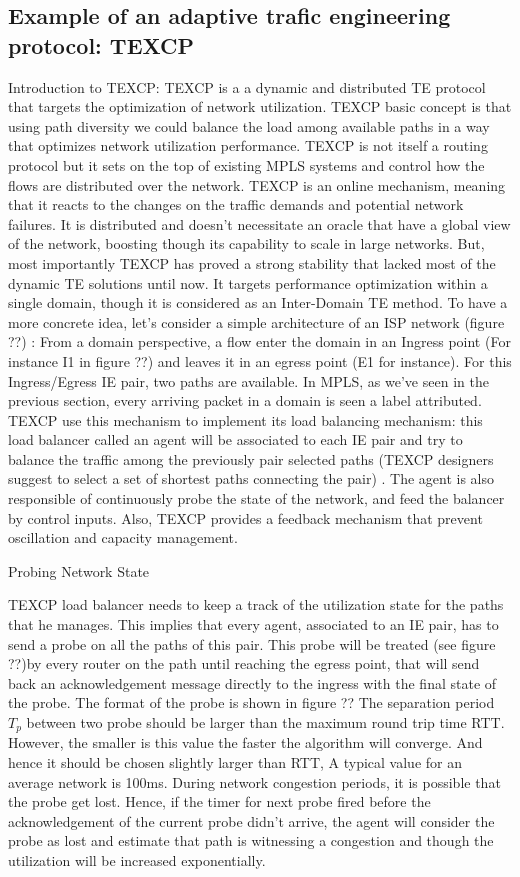 \subsection{Example of an adaptive trafic engineering protocol: TEXCP }
Introduction to TEXCP:
TEXCP is a a dynamic and distributed TE protocol that targets the optimization of network utilization. TEXCP basic concept is that using path diversity we could balance the load among available paths in a way that optimizes network utilization performance. TEXCP is not itself a routing protocol but it sets  on the top of existing MPLS systems and control how the flows are distributed over the network.
TEXCP is an online mechanism, meaning that it reacts to the changes on the traffic demands and potential network failures. It is distributed and doesn't necessitate an oracle that have a global view of the network, boosting though its capability to scale in large networks. But, most importantly TEXCP has proved a strong stability that lacked most of the dynamic TE solutions until now. 
It targets performance optimization within a single domain, though it is considered as an Inter-Domain TE method. To have a more concrete idea, let's consider a simple architecture of an ISP network (figure ??) :
From a domain perspective, a flow enter the domain in an Ingress point (For instance I1 in figure ??) and leaves it in an egress point (E1 for instance). For this Ingress/Egress IE pair, two paths are available. In MPLS, as we've seen in the previous section, every arriving packet in a domain is seen a label attributed. TEXCP use this mechanism to implement its load balancing mechanism: this load balancer called an agent will be associated to each IE pair and try to balance the traffic among the previously pair selected paths (TEXCP designers suggest to select a set of shortest paths connecting the pair) .  The agent is also responsible of continuously probe the state of the network, and feed the balancer by control inputs. Also, TEXCP provides a feedback mechanism that prevent oscillation and capacity management.

Probing Network State

TEXCP load balancer needs to keep a track of the utilization state for the paths that he manages. This implies that every agent, associated to an IE pair,  has to send a probe on all the paths of this pair. This probe will be treated (see figure ??)by every router on the path until reaching the egress point, that will send back an acknowledgement message directly to the ingress with the final state of 
the probe.
The format of the probe is shown in figure ??
The separation period $T_p$ between two probe should be larger than the maximum round trip time RTT. However, the smaller is this value the faster the algorithm will converge. And hence it should be chosen slightly larger than RTT, A typical value for an average network is 100ms. During network congestion periods, it is possible that the probe get lost.  Hence, if the timer for next probe fired before the acknowledgement of the current probe didn't arrive, the agent will consider the probe as lost and estimate that path is witnessing a congestion and though the utilization will be increased exponentially.


